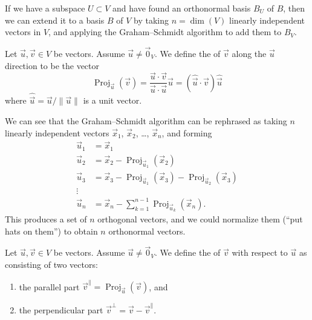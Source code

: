 \begin{remark}
If we have a subspace $U\subset V$ and have found an orthonormal basis
$B_{U}$ of $B$, then we can extend it to a basis $B$ of $V$ by taking
$n=\dim(V)$ linearly independent vectors in $V$, and applying the
Graham--Schmidt algorithm to add them to $B_{V}$.
\end{remark}

\begin{definition}\label{defn:basis:projection}
Let $\vec{u},\vec{v}\in V$ be vectors. Assume $\vec{u}\neq\vec{0}_{V}$.
We define the  of $\vec{v}$ along the $\vec{u}$
direction to be the vector
\begin{equation}
\operatorname{Proj}_{\vec{u}}(\vec{v}) = \frac{\vec{u}\cdot\vec{v}}{\vec{u}\cdot\vec{u}}\vec{u}=(\widehat{\vec{u}}\cdot\vec{v})\widehat{\vec{u}}
\end{equation}
where $\widehat{\vec{u}}=\vec{u}/\|\vec{u}\|$ is a unit vector.
\end{definition}

\begin{remark}
We can see that the Graham--Schmidt algorithm can be rephrased as taking
$n$ linearly independent vectors $\vec{x}_{1}$, $\vec{x}_{2}$, \dots,
$\vec{x}_{n}$, and forming
\begin{subequations}
\begin{align}
  \vec{u}_{1} &= \vec{x}_{1}\\
  \vec{u}_{2} &= \vec{x}_{2} - \operatorname{Proj}_{\vec{u}_{1}}(\vec{x}_{2})\\
  \vec{u}_{3} &= \vec{x}_{3} - \operatorname{Proj}_{\vec{u}_{1}}(\vec{x}_{3}) - \operatorname{Proj}_{\vec{u}_{2}}(\vec{x}_{3})\\
  \vdots \nonumber\\
  \vec{u}_{n} &= \vec{x}_{n} - \sum^{n-1}_{k=1}\operatorname{Proj}_{\vec{u}_{k}}(\vec{x}_{n}).
\end{align}
\end{subequations}
This produces a set of $n$ orthogonal vectors, and we could normalize
them (``put hats on them'') to obtain $n$ orthonormal vectors.
\end{remark}


\begin{definition}
Let $\vec{u},\vec{v}\in V$ be vectors. Assume $\vec{u}\neq\vec{0}_{V}$.
We define the  of $\vec{v}$ with
respect to $\vec{u}$ as consisting of two vectors:
\begin{enumerate}
\item the parallel part $\vec{v}^{\parallel} = \operatorname{Proj}_{\vec{u}}(\vec{v})$,
and
\item the perpendicular part $\vec{v}^{\perp} = \vec{v} - \vec{v}^{\parallel}$.
\end{enumerate}
\end{definition}
